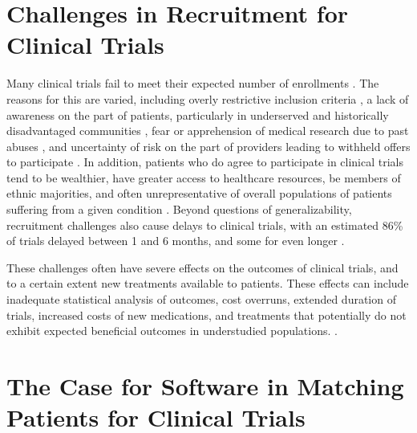 \documentclass[../main.tex]{subfiles}
\begin{document}
\section{Challenges in Recruitment for Clinical Trials}

Many clinical trials fail to meet their expected number of enrollments \cite{frank2004current, grill2010addressing, heller2014strategies, nipp2019overcoming}. The reasons for this are varied, including overly restrictive inclusion criteria \cite{grill2010addressing}, a lack of awareness on the part of patients, particularly in underserved and historically disadvantaged communities \cite{heller2014strategies}, fear or apprehension of medical research due to past abuses \cite{frank2004current}, and uncertainty of risk on the part of providers leading to withheld offers to participate \cite{nipp2019overcoming}. In addition, patients who do agree to participate in clinical trials tend to be wealthier, have greater access to healthcare resources, be members of ethnic majorities, and often unrepresentative of overall populations of patients suffering from a given condition \cite{grill2010addressing, heller2014strategies, nipp2019overcoming, guadagnolo2009involving, penberthy2010automated, holmes2012increasing}. Beyond questions of generalizability, recruitment challenges also cause delays to clinical trials, with an estimated 86\% of trials delayed between 1 and 6 months, and some for even longer \cite{sullivan2004subject, thadani2009electronic}.

These challenges often have severe effects on the outcomes of clinical trials, and to a certain extent new treatments available to patients. These effects can include inadequate statistical analysis of outcomes, cost overruns, extended duration of trials, increased costs of new medications, and treatments that potentially do not exhibit expected beneficial outcomes in understudied populations. \cite{easterbrook1992fate, penberthy2010automated, mcdonald2006influences, marks2002using}.

\section{The Case for Software in Matching Patients for Clinical Trials}
\end{document}
